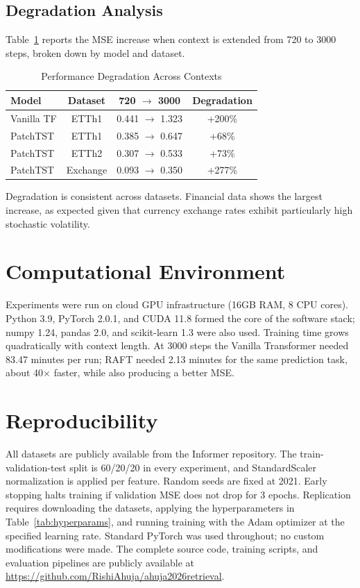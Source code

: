 \documentclass{article} %
\begin{document}
\subsection{Degradation Analysis}

Table~\ref{tab:degradation} reports the MSE increase when context is extended from 720 to 3000 steps, broken down by model and dataset.

\begin{table}[h]
\centering
\caption{Performance Degradation Across Contexts}
\label{tab:degradation}
\small
\begin{tabular}{lccc}
\toprule
\textbf{Model} & \textbf{Dataset} & \textbf{720 $\rightarrow$ 3000} & \textbf{Degradation} \\
\midrule
Vanilla TF & ETTh1 & 0.441 $\rightarrow$ 1.323 & +200\% \\
PatchTST & ETTh1 & 0.385 $\rightarrow$ 0.647 & +68\% \\
PatchTST & ETTh2 & 0.307 $\rightarrow$ 0.533 & +73\% \\
PatchTST & Exchange & 0.093 $\rightarrow$ 0.350 & +277\% \\
\bottomrule
\end{tabular}
\end{table}

Degradation is consistent across datasets. Financial data shows the largest increase, as expected given that currency exchange rates exhibit particularly high stochastic volatility.

\section{Computational Environment}

Experiments were run on cloud GPU infrastructure (16GB RAM, 8 CPU cores). Python 3.9, PyTorch 2.0.1, and CUDA 11.8 formed the core of the software stack; numpy 1.24, pandas 2.0, and scikit-learn 1.3 were also used. Training time grows quadratically with context length. At 3000 steps the Vanilla Transformer needed 83.47 minutes per run; RAFT needed 2.13 minutes for the same prediction task, about 40$\times$ faster, while also producing a better MSE.

\section{Reproducibility}

All datasets are publicly available from the Informer repository. The train-validation-test split is 60/20/20 in every experiment, and StandardScaler normalization is applied per feature. Random seeds are fixed at 2021. Early stopping halts training if validation MSE does not drop for 3 epochs. Replication requires downloading the datasets, applying the hyperparameters in Table~\ref{tab:hyperparams}, and running training with the Adam optimizer at the specified learning rate. Standard PyTorch was used throughout; no custom modifications were made. The complete source code, training scripts, and evaluation pipelines are publicly available at \url{https://github.com/RishiAhuja/ahuja2026retrieval}.
\end{document}

